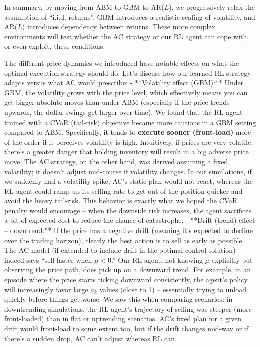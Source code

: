 \documentclass[11pt]{article}
\begin{document}
		In summary, by moving from ABM to GBM to AR($L$), we progressively relax the assumption of “i.i.d. returns”. GBM introduces a realistic scaling of volatility, and AR($L$) introduces dependency between returns. These more complex environments will test whether the AC strategy or our RL agent can cope with, or even exploit, these conditions.
	
	
	
		The different price dynamics we introduced have notable effects on what the optimal execution strategy should do. Let’s discuss how our learned RL strategy adapts versus what AC would prescribe:
		- **Volatility effect (GBM):** Under GBM, the volatility grows with the price level, which effectively means you can get bigger absolute moves than under ABM (especially if the price trends upwards, the dollar swings get larger over time). We found that the RL agent trained with a CVaR (tail-risk) objective became more cautious in a GBM setting compared to ABM. Specifically, it tends to \textbf{execute sooner (front-load)} more of the order if it perceives volatility is high. Intuitively, if prices are very volatile, there’s a greater danger that holding inventory will result in a big adverse price move. The AC strategy, on the other hand, was derived assuming a fixed volatility; it doesn’t adjust mid-course if volatility changes. In our simulations, if we suddenly had a volatility spike, AC’s static plan would not react, whereas the RL agent could ramp up its selling rate to get out of the position quicker and avoid the heavy tail-risk. This behavior is exactly what we hoped the CVaR penalty would encourage – when the downside risk increases, the agent sacrifices a bit of expected cost to reduce the chance of catastrophe.
		- **Drift (trend) effect – downtrend:** If the price has a negative drift (meaning it’s expected to decline over the trading horizon), clearly the best action is to sell as early as possible. The AC model (if extended to include drift in the optimal control solution) indeed says “sell faster when $\mu<0$.” Our RL agent, not knowing $\mu$ explicitly but observing the price path, does pick up on a downward trend. For example, in an episode where the price starts ticking downward consistently, the agent’s policy will increasingly favor large $a_k$ values (close to 1) – essentially trying to unload quickly before things get worse. We saw this when comparing scenarios: in downtrending simulations, the RL agent’s trajectory of selling was steeper (more front-loaded) than in flat or uptrending scenarios. AC’s fixed plan for a given drift would front-load to some extent too, but if the drift changes mid-way or if there’s a sudden drop, AC can’t adjust whereas RL can.
\end{document}
